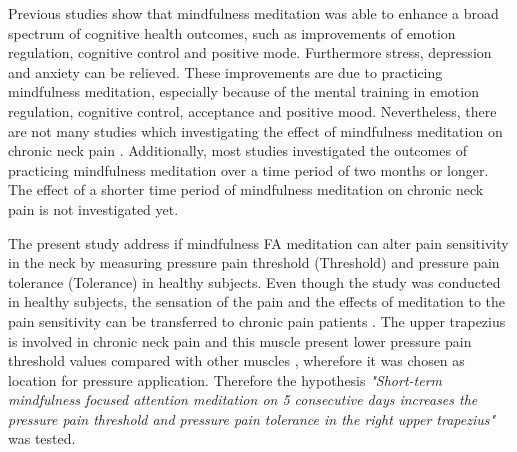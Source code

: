 Previous studies show that mindfulness meditation was able to enhance a broad spectrum of cognitive health outcomes, such as improvements of emotion regulation, cognitive control and positive mode. Furthermore stress, depression and anxiety can be relieved. These improvements are due to practicing mindfulness meditation, especially because of the mental training in emotion regulation, cognitive control, acceptance and positive mood. \cite{marcus2009, Zeidan2016, Zeidan2012} Nevertheless, there are not many studies which investigating the effect of mindfulness meditation on chronic neck pain \cite{Macfarlanea2016}. Additionally, most studies investigated the outcomes of practicing mindfulness meditation over a time period of two months or longer. The effect of a shorter time period of mindfulness meditation on chronic neck pain is not investigated yet. 


The present study address if mindfulness FA meditation can alter pain sensitivity in the neck by measuring pressure pain threshold (Threshold) and pressure pain tolerance (Tolerance) in healthy subjects. Even though the study was conducted in healthy subjects, the sensation of the pain and the effects of meditation to the pain sensitivity can be transferred to chronic pain patients \cite{Kjogx2016}. The upper trapezius is involved in chronic neck pain and this muscle present lower pressure pain threshold values compared with other muscles \cite{Fischer1987, Falla2004}, wherefore it was chosen as location for pressure application.
Therefore the hypothesis \textit{"Short-term mindfulness focused attention meditation on 5 consecutive days increases the pressure pain threshold and pressure pain tolerance in the right upper trapezius"} was tested.

